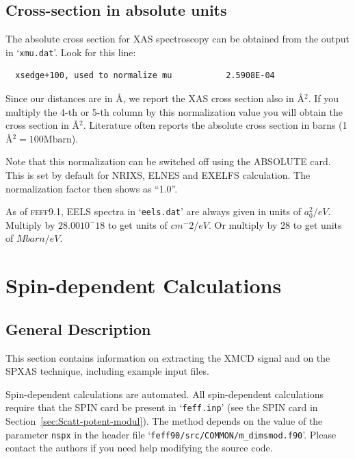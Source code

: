 \documentclass[11pt,oneside]{report} %
\renewcommand{\htmlref}[2]{\hyperlink{#2}{#1}}
\newcommand{\program}[1]{\textsc{#1}}
\newcommand{\feff}{\program{feff}}
\newcommand{\file}[1]{`\texttt{#1}'}
\renewcommand{\htmlref}[2]{{#1}} %
\begin{document}

\subsection{Cross-section in absolute units}
\label{sec:Absol-cross-sect}
The absolute cross section for XAS spectroscopy can be obtained from the output in
\file{xmu.dat}. Look for this line:

\begin{verbatim}
  xsedge+100, used to normalize mu           2.5908E-04
\end{verbatim}

Since our distances are in \AA, we report the XAS cross section also in \AA$^2$.
If you multiply the 4-th or 5-th column by this normalization value
you will obtain the cross section in \AA$^2$. Literature often reports the absolute
cross section in barns (1 \AA$^2 = 100 \mathrm{Mbarn}$).

Note that this normalization can be switched off using the ABSOLUTE card.  This is set
by default for NRIXS, ELNES and EXELFS calculation.  The normalization factor then shows as "`1.0"'. 

As of {\feff}9.1, EELS spectra in \file{eels.dat} are always given in units of $a_0^2 / eV$.  Multiply by $28.00 10^-18$  to get units of $cm^-2 / eV$.  Or multiply by $28$ to get units of  $Mbarn / eV$.



\section{Spin-dependent Calculations}
\label{sec:Spin-depend-calc}

\subsection{General Description}
\label{sec:General-description}
This section contains information on extracting the \htmlref{XMCD}{card:xnc} 
signal and on the SPXAS technique, including example input 
files.

Spin-dependent calculations are automated. All 
spin-dependent calculations require that the SPIN card be present in 
\file{feff.inp} (see the \htmlref{SPIN}{card:spi} card in 
Section~\ref{sec:Scatt-potent-modul}). 
The method depends on the value of the 
parameter \texttt{nspx} in the header file \file{feff90/src/COMMON/m\_dimsmod.f90}.
Please contact the authors if you need help modifying the source code.
\end{document}
